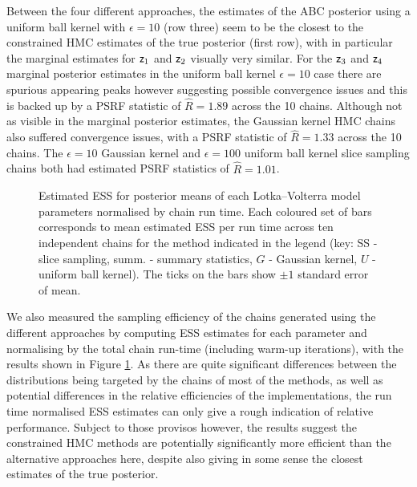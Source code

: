 Between the four different approaches, the estimates of the \ac{ABC} posterior using a uniform ball kernel with $\epsilon = 10$ (row three) seem to be the closest to the constrained \ac{HMC} estimates of the true posterior (first row), with in particular the marginal estimates for $\mathsf{z}_1$ and $\mathsf{z}_2$ visually very similar. For the $\mathsf{z}_3$ and $\mathsf{z}_4$ marginal posterior estimates in the uniform ball kernel $\epsilon = 10$ case there are spurious appearing peaks however suggesting possible convergence issues and this is backed up by a \ac{PSRF} statistic of $\hat{R} = 1.89$ across the 10 chains. Although not as visible in the marginal posterior estimates, the Gaussian kernel \ac{HMC} chains also suffered convergence issues, with a \ac{PSRF} statistic of $\hat{R} = 1.33$ across the 10 chains. The $\epsilon=10$ Gaussian kernel and $\epsilon=100$ uniform ball kernel slice sampling chains both had estimated \ac{PSRF} statistics of $\hat{R} = 1.01$.

\begin{figure}
\centering
{}
\caption[Lotka--Volterra model \acs{ESS} estimates.]{Estimated \ac{ESS} for posterior means of each Lotka--Volterra model parameters normalised by chain run time. Each coloured set of bars corresponds to mean estimated \ac{ESS} per run time across ten independent chains for the method indicated in the legend (key: SS - slice sampling, summ. - summary statistics, $G$ - Gaussian kernel, $U$ - uniform ball kernel). The ticks on the bars show $\pm 1$ standard error of mean.}
\label{fig:lotka-volterra-param-posterior-ess-plot}
\end{figure}

We also measured the sampling efficiency of the chains generated using the different approaches by computing \ac{ESS} estimates for each parameter and normalising by the total chain run-time (including warm-up iterations), with the results shown in Figure \ref{fig:lotka-volterra-param-posterior-ess-plot}. As there are quite significant differences between the distributions being targeted by the chains of most of the methods, as well as potential differences in the relative efficiencies of the implementations, the run time normalised \ac{ESS} estimates can only give a rough indication of relative performance. Subject to those provisos however, the results suggest the constrained \ac{HMC} methods are potentially significantly more efficient than the alternative approaches here, despite also giving in some sense the closest estimates of the true posterior. %

